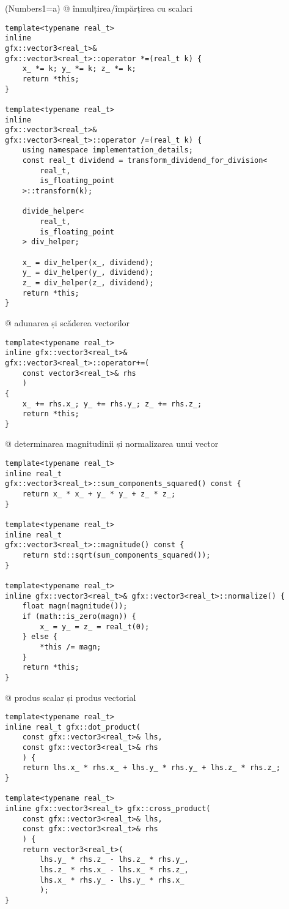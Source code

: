 \begin{easylist}[itemize]
\ListProperties(Numbers1=a)
@ înmulțirea/împărțirea cu scalari 
\begin{lstlisting}
template<typename real_t>
inline
gfx::vector3<real_t>&
gfx::vector3<real_t>::operator *=(real_t k) {
    x_ *= k; y_ *= k; z_ *= k;
    return *this;
}

template<typename real_t>
inline
gfx::vector3<real_t>&
gfx::vector3<real_t>::operator /=(real_t k) {
    using namespace implementation_details;
    const real_t dividend = transform_dividend_for_division<
        real_t, 
        is_floating_point
    >::transform(k);

    divide_helper<
        real_t,
        is_floating_point
    > div_helper;

    x_ = div_helper(x_, dividend);
    y_ = div_helper(y_, dividend);
    z_ = div_helper(z_, dividend);
    return *this;
}
\end{lstlisting}
@ adunarea și scăderea vectorilor
\begin{lstlisting}
template<typename real_t>
inline gfx::vector3<real_t>&
gfx::vector3<real_t>::operator+=(
    const vector3<real_t>& rhs
    ) 
{
    x_ += rhs.x_; y_ += rhs.y_; z_ += rhs.z_;
    return *this;
}
\end{lstlisting}

@ determinarea magnitudinii și normalizarea unui vector
\begin{lstlisting}
template<typename real_t>
inline real_t
gfx::vector3<real_t>::sum_components_squared() const {
    return x_ * x_ + y_ * y_ + z_ * z_;
}

template<typename real_t>
inline real_t
gfx::vector3<real_t>::magnitude() const {
    return std::sqrt(sum_components_squared());
}

template<typename real_t>
inline gfx::vector3<real_t>& gfx::vector3<real_t>::normalize() {
    float magn(magnitude());
    if (math::is_zero(magn)) {
        x_ = y_ = z_ = real_t(0);
    } else {
        *this /= magn;
    }
    return *this;
}
\end{lstlisting}

@ produs scalar și produs vectorial

\begin{lstlisting}
template<typename real_t>
inline real_t gfx::dot_product(
    const gfx::vector3<real_t>& lhs, 
    const gfx::vector3<real_t>& rhs
    ) {
    return lhs.x_ * rhs.x_ + lhs.y_ * rhs.y_ + lhs.z_ * rhs.z_;
}

template<typename real_t>
inline gfx::vector3<real_t> gfx::cross_product(
    const gfx::vector3<real_t>& lhs, 
    const gfx::vector3<real_t>& rhs
    ) {
    return vector3<real_t>(
        lhs.y_ * rhs.z_ - lhs.z_ * rhs.y_,
        lhs.z_ * rhs.x_ - lhs.x_ * rhs.z_,
        lhs.x_ * rhs.y_ - lhs.y_ * rhs.x_
        );
}
\end{lstlisting}


\end{easylist}
